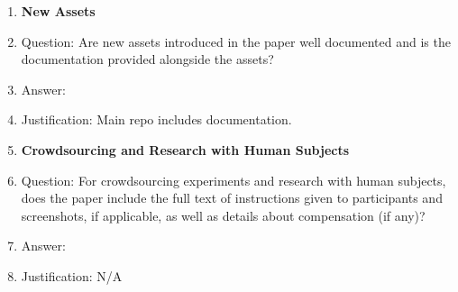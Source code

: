 \begin{enumerate}
\item {\bf New Assets}
    \item[] Question: Are new assets introduced in the paper well documented and is the documentation provided alongside the assets?
    \item[] Answer: \answerYes{} %
    \item[] Justification: Main repo includes documentation. 

\item {\bf Crowdsourcing and Research with Human Subjects}
    \item[] Question: For crowdsourcing experiments and research with human subjects, does the paper include the full text of instructions given to participants and screenshots, if applicable, as well as details about compensation (if any)? 
    \item[] Answer: \answerNA{} %
    \item[] Justification: N/A


\end{enumerate}
